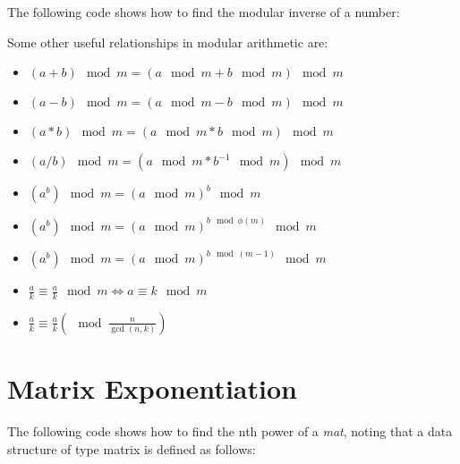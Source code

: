 The following code shows how to find the modular inverse of a number:



Some other useful relationships in modular arithmetic are:

\begin{itemize}
\item $ (a+b) \mod m = (a \mod m + b \mod m) \mod m $
\item $ (a-b) \mod m = (a \mod m - b \mod m) \mod m $
\item $ (a*b) \mod m = (a \mod m * b \mod m) \mod m $
\item $ (a/b) \mod m = (a \mod m * b^{-1} \mod m) \mod m $
\item $ (a^b) \mod m = (a \mod m)^b \mod m $
\item $ (a^b) \mod m = (a \mod m)^{b \mod \phi(m)} \mod m $
\item $ (a^b) \mod m = (a \mod m)^{b \mod (m-1)} \mod m $
\item $ \frac{a}{k} \equiv \frac{a}{k} \mod m \iff a \equiv k \mod m $
\item $ \frac{a}{k} \equiv \frac{a}{k} \left( \mod \frac{n}{\gcd (n,k)}\right)$
\end{itemize}


\section{Matrix Exponentiation}

The following code shows how to find the nth power of a \textit{mat}, noting that a data structure of type matrix is defined as follows:

